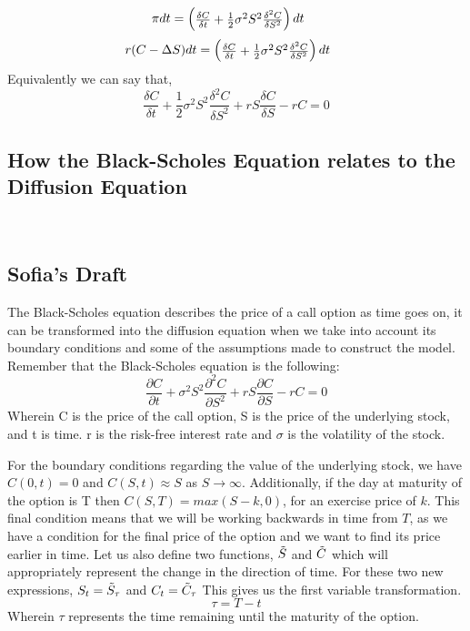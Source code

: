 \documentclass[11pt]{article}
\begin{document}
\begin{equation*}
\pi dt = 
\setlength{\arraycolsep}{2pt}\begin{pmatrix}
\frac{\delta C}{\delta t} + \frac{1}{2}\sigma^2 S^2\frac{\delta^2 C}{\delta S^2}
\end{pmatrix}dt \phantom{ccc}
\end{equation*}
\begin{equation*}
r(C-\Delta S)dt = 
\setlength{\arraycolsep}{2pt}\begin{pmatrix}
\frac{\delta C}{\delta t} + \frac{1}{2}\sigma^2 S^2\frac{\delta^2 C}{\delta S^2}
\end{pmatrix}dt \phantom{ccc}
\end{equation*}
Equivalently we can say that,
\begin{equation*}
\frac{\delta C}{\delta t} + \frac{1}{2}\sigma^2 S^2 \frac{\delta ^2 C}{\delta S^2} + rS \frac{\delta C}{\delta S} - rC = 0
\end{equation*}

\subsection{How the Black-Scholes Equation relates to the Diffusion Equation}

\
\newpage


\subsection{Sofia's Draft}
The Black-Scholes equation describes the price of a call option as time goes on, it can be transformed into the diffusion equation when we take into account its boundary conditions and some of the assumptions made to construct the model. Remember that the Black-Scholes equation is the following:
\[\frac{\partial C}{\partial t} + \sigma^2 S^2 \frac{\partial^2 C}{\partial S^2} + rS \frac{\partial C}{\partial S} - rC = 0
\]
Wherein C is the price of the call option, S is the price of the underlying stock, and t is time. r is the risk-free interest rate and $\sigma $ is the volatility of the stock.

For the boundary conditions regarding the value of the underlying stock, we have $C(0,t)=0$ and $C(S,t)\approx S$ as $S \rightarrow \infty$. Additionally, if the day at maturity of the option is T then $C(S,T)=max(S-k,0)$, for an exercise price of $k$. This final condition means that we will be working backwards in time from $T$, as we have a condition for the final price of the option and we want to find its price earlier in time. Let us also define two functions, $\Tilde{S}$ and $\Tilde{C}$ which will appropriately represent the change in the direction of time. For these two new expressions, $S_t = \Tilde{S}_\tau$ and $C_t = \Tilde{C}_\tau$
This gives us the first variable transformation.
\[
\tau = T - t
\] Wherein $\tau$ represents the time remaining until the maturity of the option.
\end{document}
